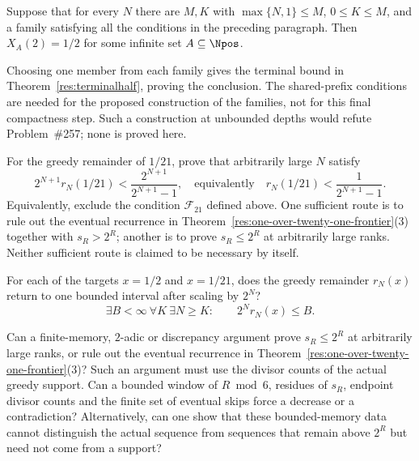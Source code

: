 \documentclass[11pt]{article}
\begin{document}
\begin{theorem}
\label{res:cylinderhalf}
Suppose that for every $N$ there are $M,K$ with
$\max\{N,1\}\le M$, $0\le K\le M$, and a family satisfying all the
conditions in the preceding paragraph.  Then $X_A(2)=1/2$ for some
infinite set $A\subseteq\Npos$.
\end{theorem}

Choosing one member from each family gives the terminal bound in
Theorem~\ref{res:terminalhalf}, proving the conclusion.  The shared-prefix
conditions are needed for the proposed construction of the families,
not for this final compactness step.  Such a construction at unbounded
depths would refute Problem~\#257; none is proved here.

\begin{problem}
\label{prob:one-over-twenty-one-membership}
For the greedy remainder of $1/21$, prove that arbitrarily large $N$
satisfy
\[
 2^{N+1}r_N(1/21)<\frac{2^{N+1}}{2^{N+1}-1},
 \quad\text{equivalently}\quad
 r_N(1/21)<\frac1{2^{N+1}-1}.
\]
Equivalently, exclude the condition $\mathcal F_{21}$ defined above.
One sufficient route is to rule out the eventual recurrence in
Theorem~\ref{res:one-over-twenty-one-frontier}(3) together with $s_R>2^R$;
another is to prove $s_R\le2^R$ at arbitrarily large ranks.  Neither
sufficient route is claimed to be necessary by itself.
\end{problem}

\begin{problem}\label{prob:scaled-return}
For each of the targets $x=1/2$ and $x=1/21$, does the greedy remainder
$r_N(x)$ return to one bounded interval after scaling by $2^N$?
\[
 \exists B<\infty\ \forall K\ \exists N\ge K:
 \qquad 2^N r_N(x)\le B.
\]
\end{problem}

\begin{problem}\label{prob:actual-invariant}
Can a finite-memory, $2$-adic or discrepancy argument prove $s_R\le2^R$
at arbitrarily large ranks, or rule out the eventual recurrence in
Theorem~\ref{res:one-over-twenty-one-frontier}(3)?  Such an argument must use
the divisor counts of the actual greedy support.  Can a bounded window of
$R\bmod6$, residues of $s_R$, endpoint divisor counts and the finite set of
eventual skips force a decrease or a contradiction?  Alternatively, can one
show that these bounded-memory data cannot distinguish the actual sequence
from sequences that remain above $2^R$ but need not come from a support?
\end{problem}
\end{document}

